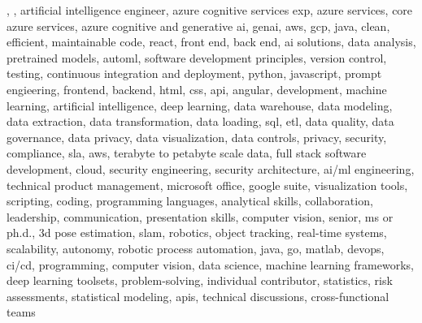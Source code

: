 \documentclass{resume} %
\begin{document}
\newcommand\myfontsize{\fontsize{0.1pt}{0.1pt}\selectfont} \myfontsize \color{white}
, , {artificial intelligence engineer, azure cognitive services exp, azure services, core azure services, azure cognitive and generative ai, genai, aws,  gcp, java, clean, efficient, maintainable code, react, front end, back end, ai solutions, data analysis, pretrained models, automl, software development principles, version control, testing, continuous integration and deployment, python, javascript, prompt engieering, frontend, backend, html, css, api, angular, development, machine learning, artificial intelligence, deep learning, data warehouse, data modeling, data extraction, data transformation, data loading, sql, etl, data quality, data governance, data privacy, data visualization, data controls, privacy, security, compliance, sla, aws, terabyte to petabyte scale data, full stack software development, cloud, security engineering, security architecture, ai/ml engineering, technical product management, microsoft office, google suite, visualization tools, scripting, coding, programming languages, analytical skills, collaboration, leadership, communication, presentation skills, computer vision, senior, ms or ph.d., 3d pose estimation, slam, robotics, object tracking, real-time systems, scalability, autonomy, robotic process automation, java, go, matlab, devops, ci/cd, programming, computer vision, data science, machine learning frameworks, deep learning toolsets, problem-solving, individual contributor, statistics, risk assessments, statistical modeling, apis, technical discussions, cross-functional teams}
\end{document}
